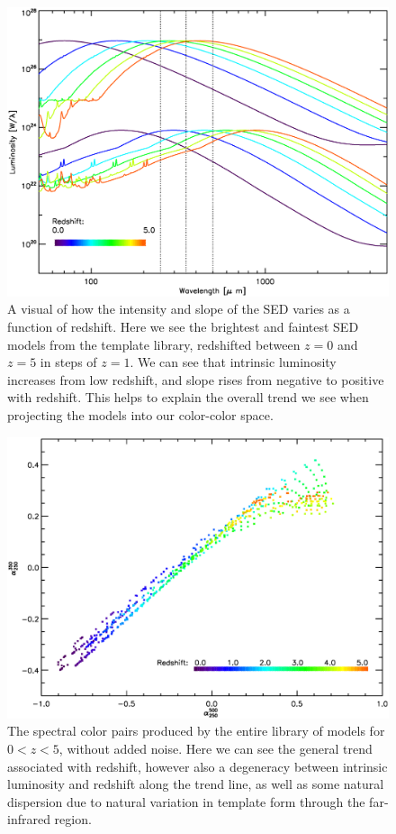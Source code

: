 \documentclass[twocolumn,letterpaper,10pt]{article}
\begin{document}
\begin{onecolumn}
\begin{figure}
\includegraphics[width=\textwidth]{model_brightness.eps}
\caption{A visual of how the intensity and slope of the SED varies as a function of redshift. Here we see the brightest and faintest SED models from the \citet{rieke09} template library, redshifted between $z=0$ and $z=5$ in steps of $z=1$. We can see that intrinsic luminosity increases from low redshift, and slope rises from negative to positive with redshift. This helps to explain the overall trend we see when projecting the models into our color-color space.}
\label{mshift}
\end{figure}

\begin{figure}
  \includegraphics[width=\textwidth]{model_colors.eps}
  \caption{The spectral color pairs produced by the entire library of models for $0<z<5$, without added noise. Here we can see the general trend associated with redshift, however also a degeneracy between intrinsic luminosity and redshift along the trend line, as well as some natural dispersion due to natural variation in template form through the far-infrared region.}
  \label{slib_color}
\end{figure}


\end{onecolumn}
\end{document}
